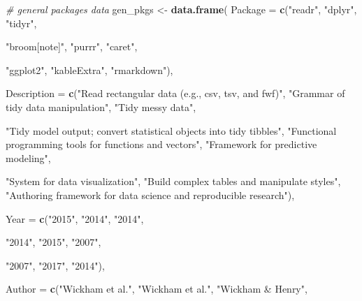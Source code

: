 \documentclass[10pt,letterpaper]{article}
\newenvironment{Shaded}{\begin{snugshade}}{\end{snugshade}}
\newcommand{\CommentTok}[1]{\textcolor[rgb]{0.56,0.35,0.01}{\textit{#1}}}
\newcommand{\DataTypeTok}[1]{\textcolor[rgb]{0.13,0.29,0.53}{#1}}
\newcommand{\KeywordTok}[1]{\textcolor[rgb]{0.13,0.29,0.53}{\textbf{#1}}}
\newcommand{\NormalTok}[1]{#1}
\newcommand{\StringTok}[1]{\textcolor[rgb]{0.31,0.60,0.02}{#1}}
\begin{document}
\begin{Shaded}
\begin{Highlighting}[]
\CommentTok{# general packages data}
\NormalTok{gen_pkgs <-}\StringTok{ }\KeywordTok{data.frame}\NormalTok{(}
  \DataTypeTok{Package =} \KeywordTok{c}\NormalTok{(}\StringTok{"readr"}\NormalTok{, }
              \StringTok{"dplyr"}\NormalTok{,}
              \StringTok{"tidyr"}\NormalTok{,}
              
              \StringTok{"broom[note]"}\NormalTok{,}
              \StringTok{"purrr"}\NormalTok{,}
              \StringTok{"caret"}\NormalTok{, }
              
              \StringTok{"ggplot2"}\NormalTok{, }
              \StringTok{"kableExtra"}\NormalTok{, }
              \StringTok{"rmarkdown"}\NormalTok{),}
  
  \DataTypeTok{Description =} \KeywordTok{c}\NormalTok{(}\StringTok{"Read rectangular data (e.g., csv, tsv, and fwf)"}\NormalTok{, }
                  \StringTok{"Grammar of tidy data manipulation"}\NormalTok{,}
                  \StringTok{"Tidy messy data"}\NormalTok{,}
                  
                  \StringTok{"Tidy model output; convert statistical objects into tidy tibbles"}\NormalTok{, }
                  \StringTok{"Functional programming tools for functions and vectors"}\NormalTok{,}
                  \StringTok{"Framework for predictive modeling"}\NormalTok{,}
                  
                  \StringTok{"System for data visualization"}\NormalTok{, }
                  \StringTok{"Build complex tables and manipulate styles"}\NormalTok{,}
                  \StringTok{"Authoring framework for data science and reproducible research"}\NormalTok{),}
  
  \DataTypeTok{Year =} \KeywordTok{c}\NormalTok{(}\StringTok{"2015"}\NormalTok{,}
           \StringTok{"2014"}\NormalTok{,}
           \StringTok{"2014"}\NormalTok{,}
  
           \StringTok{"2014"}\NormalTok{,}
           \StringTok{"2015"}\NormalTok{,}
           \StringTok{"2007"}\NormalTok{,}
                    
           \StringTok{"2007"}\NormalTok{,}
           \StringTok{"2017"}\NormalTok{, }
           \StringTok{"2014"}\NormalTok{),}
  
  \DataTypeTok{Author =} \KeywordTok{c}\NormalTok{(}\StringTok{"Wickham et al."}\NormalTok{,}
             \StringTok{"Wickham et al."}\NormalTok{, }
             \StringTok{"Wickham & Henry"}\NormalTok{,}
  

\end{Highlighting}
\end{Shaded}
\end{document}
